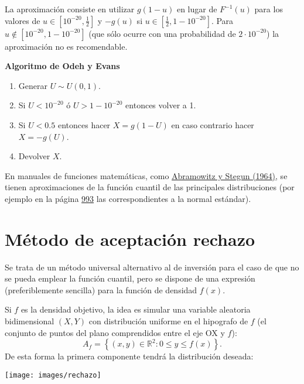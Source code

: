 \documentclass[
]{book}
\theoremstyle{break}
\theoremstyle{definition}
\theoremstyle{definition}
\theoremstyle{definition}
\theoremstyle{remark}
\begin{document}
La aproximación consiste en utilizar \(g\left( 1-u\right)\) en lugar de
\(F^{-1}\left( u\right)\) para los valores de \(u\in[10^{-20},\frac12]\)
y \(-g\left( u\right)\) si \(u\in[\frac12,1-10^{-20}]\). Para \(u\notin [10^{-20},1-10^{-20}]\) (que sólo ocurre con una probabilidad de
\(2\cdot10^{-20}\)) la aproximación no es recomendable.

\textbf{Algoritmo de Odeh y Evans}

\begin{enumerate}
\def\labelenumi{\arabic{enumi}.}
\item
  Generar \(U\sim U\left( 0,1\right)\).
\item
  Si \(U<10^{-20}\) ó \(U>1-10^{-20}\) entonces volver a 1.
\item
  Si \(U<0.5\) entonces hacer \(X=g\left(1-U\right)\)
  en caso contrario hacer \(X=-g\left( U\right)\).
\item
  Devolver \(X\).
\end{enumerate}

En manuales de funciones matemáticas, como \href{http://people.math.sfu.ca/~cbm/aands/}{Abramowitz y Stegun (1964)},
se tienen aproximaciones de la función cuantil de las principales distribuciones
(por ejemplo en la página \href{http://people.math.sfu.ca/~cbm/aands/page_933.htm}{993}
las correspondientes a la normal estándar).

\hypertarget{AR}{%
\section{Método de aceptación rechazo}\label{AR}}

Se trata de un método universal alternativo al de inversión para
el caso de que no se pueda emplear la función cuantil,
pero se dispone de una expresión (preferiblemente sencilla) para la
función de densidad \(f\left( x \right)\).

Si \(f\) es la densidad objetivo, la idea es simular una variable aleatoria
bidimensional \(\left( X, Y\right)\) con distribución
uniforme en el hipografo de \(f\) (el conjunto de puntos del plano
comprendidos entre el eje OX y \(f\)):
\[A_{f}=\left\{ \left( x,y\right) \in \mathbb{R}^{2}:0\leq y\leq
f\left( x\right) \right\}.\]
De esta forma la primera componente tendrá la distribución deseada:

\begin{center}\texttt{[image: images/rechazo]} \end{center}
\end{document}
